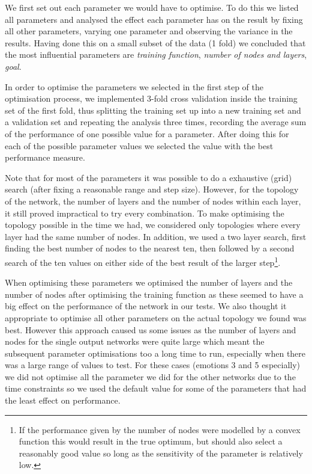 \documentclass[10pt,a4paper]{article}
\begin{document}
We first set out each parameter we would have to optimise. To do this we listed all parameters and analysed the effect each parameter has on the result by fixing all other parameters, varying one parameter and observing the variance in the results. Having done this on a small subset of the data (1 fold) we concluded that the most influential parameters are \emph{training function}, \emph{number of nodes and layers}, \emph{goal}. %

In order to optimise the parameters we selected in the first step of the optimisation process, we implemented 3-fold cross validation inside the training set of the first fold, thus splitting the training set up into a new training set and a validation set and repeating the analysis three times, recording the average sum of the performance of one possible value for a parameter. After doing this for each of the possible parameter values we selected the value with the best performance measure.

Note that for most of the parameters it was possible to do a exhaustive (grid) search (after fixing a reasonable range and step size). However, for the topology of the network, the number of layers and the number of nodes within each layer, it still proved impractical to try every combination. To make optimising the topology possible in the time we had, we considered only topologies where every layer had the same number of nodes. In addition, we used a two layer search, first finding the best number of nodes to the nearest ten, then followed by a second search of the ten values on either side of the best result of the larger step\footnote{If the performance given by the number of nodes were modelled by a convex function this would result in the true optimum, but should also select a reasonably good value so long as the sensitivity of the parameter is relatively low.}.

When optimising these parameters we optimised the number of layers and the number of nodes after optimising the training function as these seemed to have a big effect on the performance of the network in our tests. We also thought it appropriate to optimise all other parameters on the actual topology we found was best. However this approach caused us some issues as the number of layers and nodes for the single output networks were quite large which meant the subsequent parameter optimisations too a long time to run, especially when there was a large range of values to test. For these cases (emotions 3 and 5 especially) we did not optimise all the parameter we did for the other networks due to the time constraints so we used the default value for some of the parameters that had the least effect on performance.   
\end{document}
